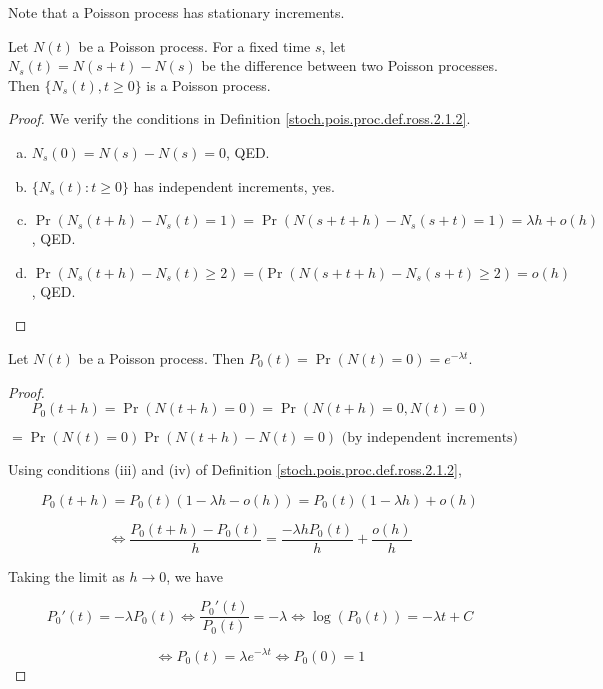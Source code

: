 \begin{remark} Note that a Poisson process has stationary increments.

\end{remark}

\begin{lemma} \label{stoch.ross.lemma1}Let \(N(t)\) be a Poisson process. For a fixed time \(s\), let \(N_s(t) = N(s+t) - N(s)\) be the difference between two Poisson processes. Then \(\{N_s(t), t \geq 0\} \) is a Poisson process.
\end{lemma}

\begin{proof} We verify the conditions in Definition \ref{stoch.pois.proc.def.ross.2.1.2}.

\begin{enumerate}[(a)]

\item \(N_s(0) = N(s) - N(s) = 0\), QED.

\item \(\{N_s(t) : t \geq 0\}\) has independent increments, yes.

\item \(\Pr(N_s(t+h) - N_s(t) = 1) = \Pr(N(s+ t+h) - N_s(s + t) = 1) =  \lambda h + o(h)\), QED.

\item \(\Pr(N_s(t+h) - N_s (t) \geq 2) = (\Pr(N(s + t+h) - N_s (s + t) \geq 2)  = o(h)\), QED.


\end{enumerate}

\end{proof}

\begin{lemma}\label{stoch.ross.lemma2}Let \(N(t)\) be a Poisson process. Then \(P_0(t) = \Pr(N(t) =0) = e^{-\lambda t}\).
\end{lemma} 

\begin{proof}

\[
P_0(t+h) = \Pr(N(t+h) = 0) = \Pr(N(t+h)= 0, N(t) =0) 
\]

\[
= \Pr(N(t) = 0) \Pr(N(t+h) - N(t) =0) \text{ (by independent increments)}
\]

Using conditions (iii) and (iv) of Definition \ref{stoch.pois.proc.def.ross.2.1.2},

\[
P_0(t+h) = P_0(t)(1 - \lambda h - o(h) ) = P_0(t) (1 - \lambda h) + o(h)
\]

\[
\iff \frac{P_0(t + h) - P_0(t)}{h} = \frac{-\lambda h P_0(t)}{h} + \frac{o(h)}{h} 
\]

Taking the limit as \(h \to 0\), we have

\[
P_0'(t) = - \lambda P_0(t) \iff \frac{P_0'(t)}{P_0(t)} = -\lambda \iff \log(P_0(t)) = -\lambda t + C
\]

\[
\iff P_0(t) = \lambda e^{- \lambda t} \iff P_0(0) = 1
\]

\end{proof}


